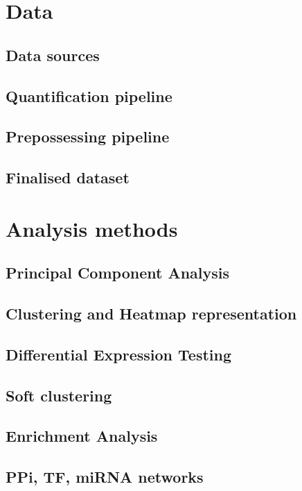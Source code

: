 \section{Data}
    \subsection{Data sources}
    \subsection{Quantification pipeline}
    \subsection{Prepossessing pipeline}
    \subsection{Finalised dataset}
    
    
\section{Analysis methods}

    \subsection{Principal Component Analysis}

    \subsection{Clustering and Heatmap representation}

    \subsection{Differential Expression Testing}

    \subsection{Soft clustering}
    
    \subsection{Enrichment Analysis}
    
    \subsection{PPi, TF, miRNA networks}